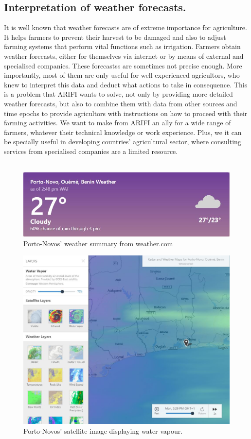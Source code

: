 \subsection{Interpretation of weather forecasts.}
%
It is well known that weather forecasts are of extreme importance for agriculture. It helps farmers to prevent their harvest to be damaged and also to adjust farming systems that perform vital functions such as irrigation. Farmers obtain weather forecasts, either for themselves via internet or by means of external and specialised companies. These forecastss are sometimes not precise enough. More importantly, most of them are only useful for well experienced agricultors, who knew to interpret this data and deduct what actions to take in consequence. This is a problem that ARIFI wants to solve, not only by providing more detailed weather forecasts, but also to combine them with data from other sources and time epochs to provide agricultors with instructions on how to proceed with their farming activities. We want to make from ARIFI an ally for a wide range of farmers, whatever their technical knowledge or work experience. Plus, we it can be specially useful in developing countries' agricultural sector, where consulting services from specialised companies are a limited resource.\\\\
%
%
\begin{figure}[b!]
    \centering
    \includegraphics[scale=0.7]{images/benin.JPG}
    \caption{Porto-Novos' weather summary from weather.com}
    \label{fig:benin}
\end{figure}
\begin{figure}[b!]
    \centering
    \includegraphics[scale=0.6]{images/water_vapor.JPG}
    \caption{Porto-Novos' satellite image displaying water vapour.}
    \label{fig:vapour}
\end{figure}
